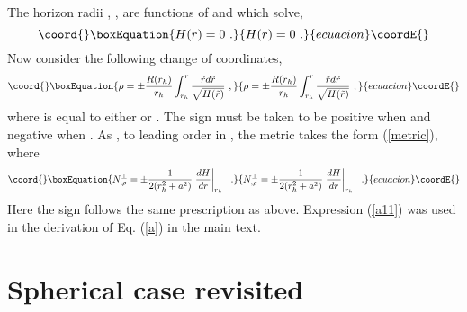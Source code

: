 \documentclass[a4paper,preprintnumbers,amsmath,amssymb]{revtex4}
\begin{document}
The horizon radii \coordHE{}, \coordHE{}, are functions of \coordHE{} and \coordHE{} which solve,
\begin{equation}\coord{}\boxEquation{
H(r) = 0 \ .
\label{hor}
}{
H(r) = 0 \ .
}{ecuacion}\coordE{}\end{equation}
Now consider the following change of coordinates,
\begin{equation}\coord{}\boxEquation{
\rho = \pm\frac{R(r_h)}{r_h}\int_{r_h}^{r}\frac{\tilde{r}d\tilde{r}}{\sqrt{H(\tilde{r})}} \ ,
\label{change}
}{
\rho = \pm\frac{R(r_h)}{r_h}\int_{r_h}^{r}\frac{\tilde{r}d\tilde{r}}{\sqrt{H(\tilde{r})}} \ ,
}{ecuacion}\coordE{}\end{equation}
where \coordHE{} is equal to either \coordHE{} or \coordHE{}. The sign must be taken
to be positive when \coordHE{} and negative when \coordHE{}.
As \coordHE{}, to leading order in
\myHighlight{$\rho$}\coordHE{}, the metric takes the form (\ref{metric}), where
\begin{equation}\coord{}\boxEquation{
N^{\perp}_{,\rho} = \pm\frac{1}{2(r_h^2+a^2)} \left.\frac{dH}{dr}\right|_{r_h} \ \ .
\label{a11}
}{
N^{\perp}_{,\rho} = \pm\frac{1}{2(r_h^2+a^2)} \left.\frac{dH}{dr}\right|_{r_h} \ \ .
}{ecuacion}\coordE{}\end{equation}
Here the sign follows the same prescription as above.
Expression (\ref{a11}) was used in the derivation of Eq. (\ref{a}) in the main  text.

\section{Spherical case revisited}
\end{document}
